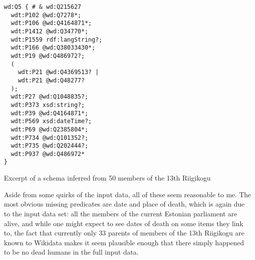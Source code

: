 \begin{listing}[t]
\begin{lstlisting}[language=sparql]
wd:Q5 { # & wd:Q215627
  wdt:P102 @wd:Q7278*;
  wdt:P106 @wd:Q4164871*;
  wdt:P1412 @wd:Q34770*;
  wdt:P1559 rdf:langString?;
  wdt:P166 @wd:Q38033430*;
  wdt:P19 @wd:Q486972?;
  (
    wdt:P21 @wd:Q4369513? |
    wdt:P21 @wd:Q48277?
  );
  wdt:P27 @wd:Q1048835?;
  wdt:P373 xsd:string?;
  wdt:P39 @wd:Q4164871*;
  wdt:P569 xsd:dateTime?;
  wdt:P69 @wd:Q2385804*;
  wdt:P734 @wd:Q101352?;
  wdt:P735 @wd:Q202444?;
  wdt:P937 @wd:Q486972*
}
\end{lstlisting}
\caption{Excerpt of a \gls{schema} inferred from 50 members of the 13th Riigikogu}
\label{listing:13th-riigikogu-Q5}
\end{listing}

Aside from some quirks of the input data, all of these seem reasonable to me.
The most obvious missing \glspl{predicate} are date and place of death,
which is again due to the input data set:
all the members of the current Estonian parliament are alive,
and while one might expect to see dates of death on some \glspl{item} they link to,
the fact that currently only 33 parents of members of the 13th Riigikogu are known to \gls{Wikidata}
makes it seem plausible enough that there simply happened to be no dead humans in the full input data.

